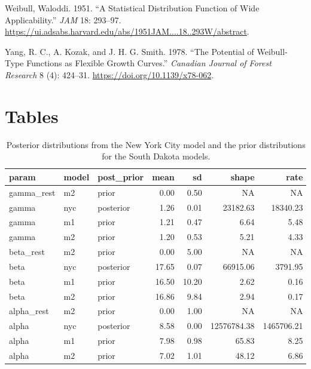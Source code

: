 \documentclass[
]{article}
\begin{document}
\leavevmode\hypertarget{ref-weibull_statistical_1951}{}%
Weibull, Waloddi. 1951. ``A Statistical Distribution Function of Wide Applicability.'' \emph{JAM} 18: 293--97. \url{https://ui.adsabs.harvard.edu/abs/1951JAM....18..293W/abstract}.

\leavevmode\hypertarget{ref-yang_potential_1978}{}%
Yang, R. C., A. Kozak, and J. H. G. Smith. 1978. ``The Potential of Weibull-Type Functions as Flexible Growth Curves.'' \emph{Canadian Journal of Forest Research} 8 (4): 424--31. \url{https://doi.org/10.1139/x78-062}.

\hypertarget{tables}{%
\section{Tables}\label{tables}}

\begin{table}[!h]

\caption{\label{tab:unnamed-chunk-1}Posterior distributions from the New York City model and the prior distributions for the South Dakota models.}
\centering
\begin{tabular}[t]{lllrrrr}
\toprule
param & model & post\_prior & mean & sd & shape & rate\\
\midrule
\rowcolor{gray!6}  gamma\_rest & m2 & prior & 0.00 & 0.50 & NA & NA\\
gamma & nyc & posterior & 1.26 & 0.01 & 23182.63 & 18340.23\\
\rowcolor{gray!6}  gamma & m1 & prior & 1.21 & 0.47 & 6.64 & 5.48\\
gamma & m2 & prior & 1.20 & 0.53 & 5.21 & 4.33\\
\rowcolor{gray!6}  beta\_rest & m2 & prior & 0.00 & 5.00 & NA & NA\\
\addlinespace
beta & nyc & posterior & 17.65 & 0.07 & 66915.06 & 3791.95\\
\rowcolor{gray!6}  beta & m1 & prior & 16.50 & 10.20 & 2.62 & 0.16\\
beta & m2 & prior & 16.86 & 9.84 & 2.94 & 0.17\\
\rowcolor{gray!6}  alpha\_rest & m2 & prior & 0.00 & 1.00 & NA & NA\\
alpha & nyc & posterior & 8.58 & 0.00 & 12576784.38 & 1465706.21\\
\addlinespace
\rowcolor{gray!6}  alpha & m1 & prior & 7.98 & 0.98 & 65.83 & 8.25\\
alpha & m2 & prior & 7.02 & 1.01 & 48.12 & 6.86\\
\bottomrule
\end{tabular}
\end{table}
\end{document}
